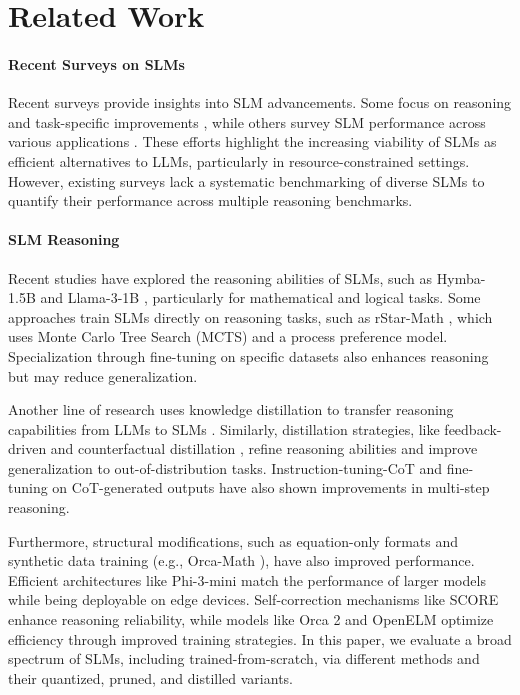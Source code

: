 
\section{Related Work}
\label{section:2}
\paragraph{Recent Surveys on SLMs}
Recent surveys provide insights into SLM advancements. Some focus on reasoning and task-specific improvements \cite{subramanian2025small, wang2024comprehensive}, while others survey SLM performance across various applications \cite{lu2024small, van2024survey}. These efforts highlight the increasing viability of SLMs as efficient alternatives to LLMs, particularly in resource-constrained settings. However, existing surveys lack a systematic benchmarking of diverse SLMs to quantify their performance across multiple reasoning benchmarks.

\paragraph{SLM Reasoning}
Recent studies have explored the reasoning abilities of SLMs, such as Hymba-1.5B \cite{dong2024hymba} and Llama-3-1B \cite{fedorov2024llama}, particularly for mathematical and logical tasks. Some approaches train SLMs directly on reasoning tasks, such as rStar-Math \cite{guan2025rstar}, which uses Monte Carlo Tree Search (MCTS) and a process preference model. Specialization through fine-tuning on specific datasets also enhances reasoning \cite{fu2023specializing} but may reduce generalization.

Another line of research uses knowledge distillation \cite{gou2021knowledge, phuong2019towards} to transfer reasoning capabilities from LLMs to SLMs \cite{zhu2024distilling}. Similarly, distillation strategies, like feedback-driven \cite{zhu2024improving} and counterfactual distillation \cite{feng2024teaching}, refine reasoning abilities and improve generalization to out-of-distribution tasks. Instruction-tuning-CoT \cite{ranaldi2024aligning} and fine-tuning on CoT-generated outputs \cite{magister2022teaching} have also shown improvements in multi-step reasoning.

Furthermore, structural modifications, such as equation-only formats \cite{kim2024small} and synthetic data training (e.g., Orca-Math \cite{mitra2024orca}), have also improved performance. Efficient architectures like Phi-3-mini \cite{abdin2024phi} match the performance of larger models while being deployable on edge devices. Self-correction mechanisms like SCORE \cite{zhang2024small} enhance reasoning reliability, while models like Orca 2 \cite{mitra2023orca} and OpenELM \cite{mehta2024openelm} optimize efficiency through improved training strategies. In this paper, we evaluate a broad spectrum of SLMs, including trained-from-scratch, via different methods and their quantized, pruned, and distilled variants.


